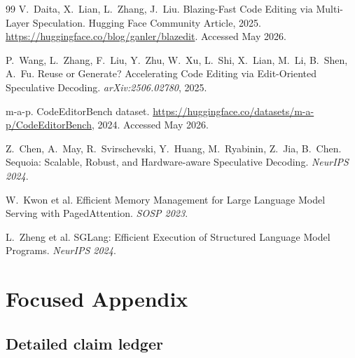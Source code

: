 \documentclass[11pt,a4paper]{article}
\begin{document}
\begin{thebibliography}{99}
V.~Daita, X.~Lian, L.~Zhang, J.~Liu.
\newblock Blazing-Fast Code Editing via Multi-Layer Speculation.
\newblock Hugging Face Community Article, 2025.
\newblock \url{https://huggingface.co/blog/ganler/blazedit}.
Accessed May 2026.

P.~Wang, L.~Zhang, F.~Liu, Y.~Zhu, W.~Xu, L.~Shi, X.~Lian, M.~Li,
B.~Shen, A.~Fu.
\newblock Reuse or Generate? Accelerating Code Editing via Edit-Oriented Speculative Decoding.
\newblock \emph{arXiv:2506.02780}, 2025.

m-a-p.
\newblock CodeEditorBench dataset.
\newblock \url{https://huggingface.co/datasets/m-a-p/CodeEditorBench}, 2024.
Accessed May 2026.

Z.~Chen, A.~May, R.~Svirschevski, Y.~Huang, M.~Ryabinin, Z.~Jia, B.~Chen.
\newblock Sequoia: Scalable, Robust, and Hardware-aware Speculative Decoding.
\newblock \emph{NeurIPS 2024}.

W.~Kwon et al.
\newblock Efficient Memory Management for Large Language Model Serving with PagedAttention.
\newblock \emph{SOSP 2023}.

L.~Zheng et al.
\newblock SGLang: Efficient Execution of Structured Language Model Programs.
\newblock \emph{NeurIPS 2024}.

\end{thebibliography}

\appendix

\section{Focused Appendix}

\subsection{Detailed claim ledger}
\end{document}

